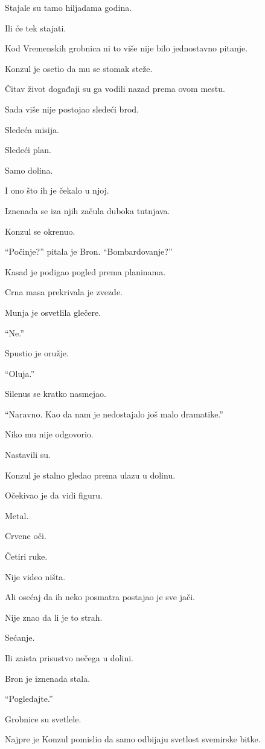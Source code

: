 Stajale su tamo hiljadama godina.

Ili će tek stajati.

Kod Vremenskih grobnica ni to više nije bilo jednostavno pitanje.

Konzul je osetio da mu se stomak steže.

Čitav život događaji su ga vodili nazad prema ovom mestu.

Sada više nije postojao sledeći brod.

Sledeća misija.

Sledeći plan.

Samo dolina.

I ono što ih je čekalo u njoj.

Iznenada se iza njih začula duboka tutnjava.

Konzul se okrenuo.

``Počinje?'' pitala je Bron. ``Bombardovanje?''

Kasad je podigao pogled prema planinama.

Crna masa prekrivala je zvezde.

Munja je osvetlila glečere.

``Ne.''

Spustio je oružje.

``Oluja.''

Silenus se kratko nasmejao.

``Naravno. Kao da nam je nedostajalo još malo dramatike.''

Niko mu nije odgovorio.

Nastavili su.

\bigskip

Konzul je stalno gledao prema ulazu u dolinu.

Očekivao je da vidi figuru.

Metal.

Crvene oči.

Četiri ruke.

Nije video ništa.

Ali osećaj da ih neko posmatra postajao je sve jači.

Nije znao da li je to strah.

Sećanje.

Ili zaista prisustvo nečega u dolini.

Bron je iznenada stala.

``Pogledajte.''

Grobnice su svetlele.

Najpre je Konzul pomislio da samo odbijaju svetlost svemirske bitke.

